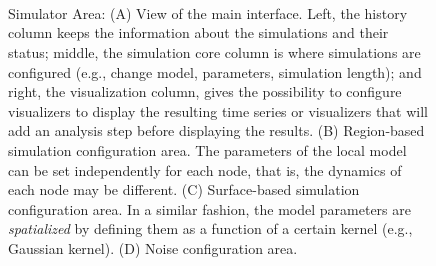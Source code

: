     \begin{figure}[!htbp]

    \centering
      \\
      \\
      \\
      \caption{\TVB Simulator Area: 
      (A) View of the main interface. Left, the history column keeps the information about the simulations and their status; middle, the simulation core column is where simulations are configured (e.g., change model, parameters, simulation length); and right, the visualization column, gives the possibility to configure visualizers to display the resulting time series or visualizers that will add an analysis step before displaying the results.  
      (B) Region-based simulation configuration area. The parameters of the local model can be set independently for each node, that is, the dynamics of each node may be different. 
      (C) Surface-based simulation configuration area. In a similar fashion, the model parameters are \emph{spatialized} by defining them as a function of a certain kernel (e.g., Gaussian kernel).
      (D) Noise configuration area. }
    \label{fig:simulator}
    \end{figure}

